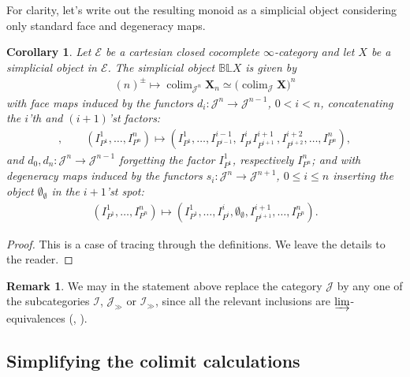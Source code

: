 \documentclass[12pt, reqno]{amsart}
\theoremstyle{plain}
\newtheorem{corollary}[theorem]{Corollary}
\theoremstyle{definition}
\newtheorem{remark}[theorem]{Remark}
\begin{document}
For clarity, let's write out the resulting monoid as a simplicial object considering only standard face and degeneracy maps.

\begin{corollary}\label{monoid over J}
Let $\mathcal{E}$ be a cartesian closed cocomplete $\infty$-category and let $X$ be a simplicial object in $\mathcal{E}$. The simplicial object $\mathbb{B}\mathbb{L}X$ is given by 
\begin{align*}
(n)^\pm \mapsto \mathop{\operatorname{colim}}_{\mathcal{J}^n}\mathbf{X}_n \simeq \big(\mathop{\operatorname{colim}}_{\mathcal{J}}\mathbf{X}\big)^n
\end{align*}
with face maps induced by the functors $d_i\colon \mathcal{J}^n\rightarrow \mathcal{J}^{n-1}$, $0<i<n$, concatenating the $i$'th and $(i+1)$'st factors:
\begin{align*}
,\qquad (I^1_{P^1},\ldots,I^n_{P^n})\mapsto (I^1_{P^1},\ldots,I^{i-1}_{P^{i-1}},\, I^i_{P^i}I^{i+1}_{P^{i+1}}\, , I^{i+2}_{P^{i+2}},\ldots,I^n_{P^n}),
\end{align*}
and $d_0,d_n\colon \mathcal{J}^n\rightarrow \mathcal{J}^{n-1}$ forgetting the factor $I^1_{P^1}$, respectively $I^n_{P^n}$; and
with degeneracy maps induced by the functors $s_i\colon \mathcal{J}^n\rightarrow \mathcal{J}^{n+1}$, $0\leq i\leq n$ inserting the object $\emptyset_\emptyset$ in the $i+1$'st spot:
\begin{align*}
(I^1_{P^1},\ldots,I^n_{P^n})\mapsto (I^1_{P^1},\ldots,I^i_{P^i},\emptyset_\emptyset,I^{i+1}_{P^{i+1}},\ldots,I^n_{P^n}).
\end{align*}
\end{corollary}
\begin{proof}
This is a case of tracing through the definitions. We leave the details to the reader.
\end{proof}

\begin{remark}
We may in the statement above replace the category $\mathcal{J}$ by any one of the subcategories $\mathcal{I}$, $\mathcal{J}_\gg$ or $\mathcal{I}_\gg$, since all the relevant inclusions are $\varinjlim$-equivalences (, ).
\end{remark}


\subsection{Simplifying the colimit calculations}\label{picking out non-degenerates}
\end{document}
